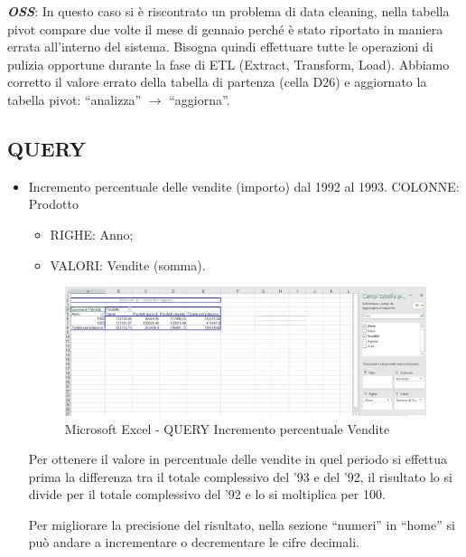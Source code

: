 \textbf{\textit{OSS}}: In questo caso si è riscontrato un problema di data cleaning, nella tabella pivot compare due volte il mese di gennaio perché è stato riportato in maniera errata all’interno del sistema. Bisogna quindi effettuare tutte le operazioni di pulizia opportune durante la fase di ETL (Extract, Transform, Load). Abbiamo corretto il valore errato della tabella di partenza (cella D26) e aggiornato la tabella pivot: “analizza” $\rightarrow$ “aggiorna”.   

\subsection{QUERY} 

\begin{itemize}

\item Incremento percentuale delle vendite (importo) dal 1992 al 1993. COLONNE: Prodotto 

\begin{itemize}
\item{RIGHE}: Anno;
\item{VALORI}: Vendite (somma).
\end{itemize}

\begin{center}
\begin{figure}[H]
\centering
\includegraphics[scale=0.8]{figures/perc_increment.png}
\caption{Microsoft Excel - QUERY Incremento percentuale Vendite}
\end{figure}
\end{center}

Per ottenere il valore in percentuale delle vendite in quel periodo si effettua prima la differenza tra il totale complessivo del '93 e del ’92, il risultato lo si divide per il totale complessivo del ’92 e lo si moltiplica per 100.  

Per migliorare la precisione del risultato, nella sezione “numeri” in “home” si può andare a incrementare o decrementare le cifre decimali.  


\end{itemize}
